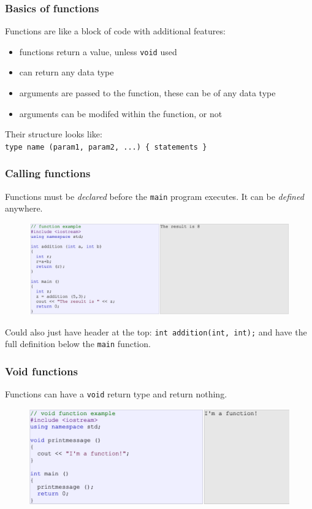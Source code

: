 \documentclass{if-beamer}
\begin{document}
\begin{frame}
\frametitle{Basics of functions}
Functions are like a block of code with additional features:
\begin{itemize}
\item functions return a value, unless \texttt{void} used
\item can return any data type
\item arguments are passed to the function, these can be of any data type
\item arguments can be modifed within the function, or not
\end{itemize}
Their structure looks like: \\
{\footnotesize \texttt{type name (param1, param2, ...) \{ statements \} }}
\end{frame}

\begin{frame}
\frametitle{Calling functions}
Functions must be \textit{declared} before the \texttt{main} program executes.
It can be \textit{defined} anywhere.
\begin{figure}
\center
\includegraphics[width=1\textwidth]{figures/func.png}
\end{figure}
Could also just have header at the top: \texttt{int addition(int, int);} and have
the full definition below the \texttt{main} function.
\end{frame}

\begin{frame}
\frametitle{Void functions}
Functions can have a \texttt{void} return type and return nothing.
\begin{figure}
\center
\includegraphics[width=1\textwidth]{figures/void.png}
\end{figure}
\end{frame}
\end{document}
